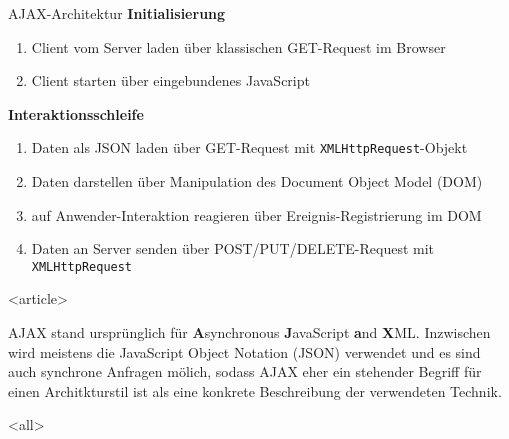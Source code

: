 \begin{Frame}{AJAX-Architektur}{}
  {\bfseries Initialisierung}
  \begin{enumerate}
    \item Client vom Server laden 
      {\newline
      über klassischen GET-Request im Browser}
    \item Client starten 
      {\newline
      über eingebundenes JavaScript}
  \end{enumerate}    
  
  
  {\bfseries Interaktionsschleife}
  \begin{enumerate}
    \item Daten als JSON laden 
      {\newline
      über GET-Request mit \texttt{XMLHttpRequest}-Objekt}
    \item Daten darstellen 
      {\newline
      über Manipulation des Document Object Model (DOM)}
    \item auf Anwender-Interaktion reagieren 
      {\newline
      über Ereignis-Registrierung im DOM}
    \item Daten an Server senden
      {\newline
      über POST/PUT/DELETE-Request mit \texttt{XMLHttpRequest}}
  \end{enumerate}
\end{Frame}

\mode
<article>

AJAX stand ursprünglich für
\textbf{A}synchronous \textbf{J}avaScript \textbf{a}nd \textbf{X}ML.
Inzwischen wird meistens die JavaScript Object Notation (JSON)
verwendet und es sind auch synchrone Anfragen mölich, sodass
AJAX eher ein stehender Begriff für einen Architkturstil ist als
eine konkrete Beschreibung der verwendeten Technik.

\mode
<all>
